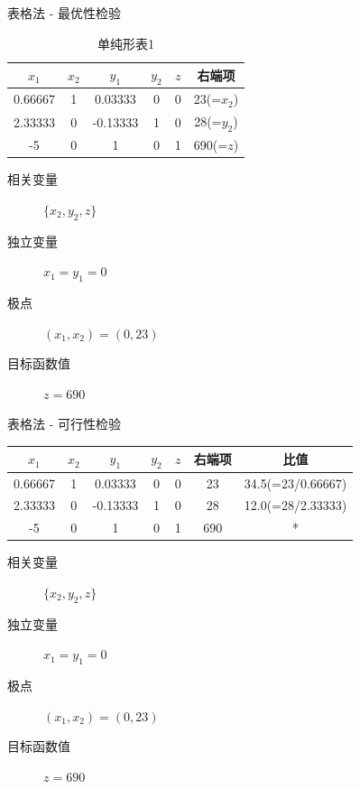 \documentclass[mathserif, table]{beamer}
\begin{document}
\begin{frame}{表格法 - 最优性检验}

  \begin{table}
    \centering
    \begin{tabular}{|ccccc|c|}
      \hline
      {\color{red}$x_1$} & $x_2$ & $y_1$ & $y_2$ & $z$ & 右端项 \\
      \hline
      0.66667 & 1 & 0.03333 & 0 & 0 & 23(=$x_2$)\\
      2.33333 & 0 & -0.13333 & 1 & 0 & 28(=$y_2$)\\
      \hline
      {\color{red}-5} & 0 & 1 & 0 & 1 & 690(=$z$)\\
      \hline
    \end{tabular}
    \caption{单纯形表1}
  \end{table}

  \begin{description}
  \item[相关变量] $\{x_2, y_2, z\}$
  \item[独立变量] $x_1=y_1=0$
  \item[极点] $(x_1, x_2) = (0, 23)$
  \item[目标函数值] $z = 690$
  \end{description}

\end{frame}

\begin{frame}{表格法 - 可行性检验}

  \begin{table}
    \centering
    \begin{tabular}{|ccccc|c|c|}
      \hline
      {\color{red}$x_1$} & $x_2$ & $y_1$ & $y_2$ & $z$ & 右端项 & 比值\\
      \hline
      0.66667 & 1 & 0.03333 & 0 & 0 & 23 & 34.5(=23/0.66667)\\
      2.33333 & 0 & -0.13333 & 1 & 0 & 28 & {\color{green}12.0(=28/2.33333)}\\
      \hline
      {\color{red}-5} & 0 & 1 & 0 & 1 & 690 & *\\
      \hline
    \end{tabular}
  \end{table}

  \begin{description}
  \item[相关变量] $\{x_2, y_2, z\}$
  \item[独立变量] $x_1=y_1=0$
  \item[极点] $(x_1, x_2) = (0, 23)$
  \item[目标函数值] $z = 690$
  \end{description}

\end{frame}
\end{document}

